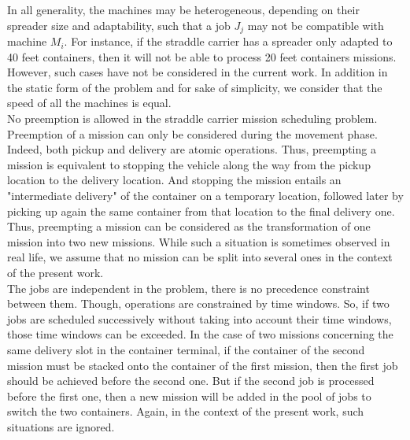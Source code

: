 \documentclass[a4paper,10pt]{article}
\begin{document}
In all generality, the machines may be heterogeneous, depending on their spreader size and adaptability, such that a job $J_j$ may not be compatible with machine $M_i$. For instance, if the straddle carrier has a spreader only adapted to 40 feet containers, then it will not be able to process 20 feet containers missions. However, such cases have not be considered in the current work. In addition in the static form of the problem and for sake of simplicity, we consider that the speed of all the machines is equal. \\

No preemption is allowed in the straddle carrier mission scheduling problem. Preemption of a mission can only be considered during the movement phase. Indeed, both pickup and delivery are atomic operations. Thus, preempting a mission is equivalent to stopping the vehicle along the way from the pickup location to the delivery location. And stopping the mission entails an "intermediate delivery" of the container on a temporary location, followed later by picking up again the same container from that location to the final delivery one. Thus, preempting a mission can be considered as the transformation of one mission into two new missions. While such a situation is sometimes observed in real life, we assume that no mission can be split into several ones in the context of the present work.\\

The jobs are independent in the problem, there is no precedence constraint between them. Though, operations are constrained by time windows. So, if two jobs are scheduled successively without taking into account their time windows, those time windows can be exceeded. In the case of two missions concerning the same delivery slot in the container terminal, if the container of the second mission must be stacked onto the container of the first mission, then the first job should be achieved before the second one. But if the second job is processed before the first one, then a new mission will be added in the pool of jobs to switch the two containers. Again, in the context of the present work, such situations are ignored. %
\end{document}

